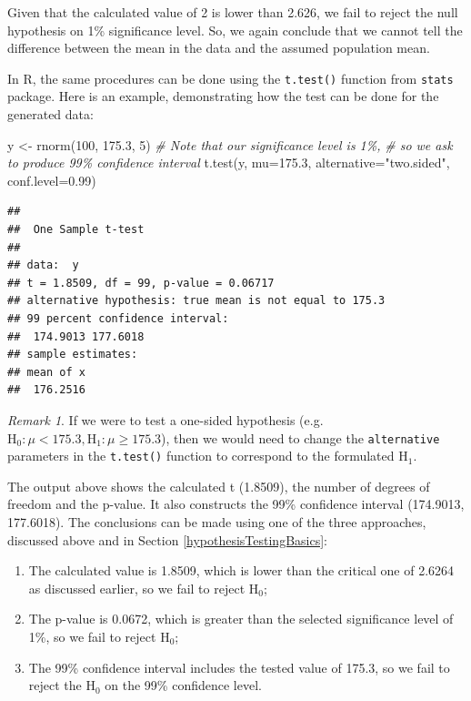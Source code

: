 \documentclass[
]{book}
\newenvironment{Shaded}{\begin{snugshade}}{\end{snugshade}}
\newcommand{\AttributeTok}[1]{\textcolor[rgb]{0.77,0.63,0.00}{#1}}
\newcommand{\CommentTok}[1]{\textcolor[rgb]{0.56,0.35,0.01}{\textit{#1}}}
\newcommand{\DecValTok}[1]{\textcolor[rgb]{0.00,0.00,0.81}{#1}}
\newcommand{\FloatTok}[1]{\textcolor[rgb]{0.00,0.00,0.81}{#1}}
\newcommand{\FunctionTok}[1]{\textcolor[rgb]{0.00,0.00,0.00}{#1}}
\newcommand{\NormalTok}[1]{#1}
\newcommand{\OtherTok}[1]{\textcolor[rgb]{0.56,0.35,0.01}{#1}}
\newcommand{\StringTok}[1]{\textcolor[rgb]{0.31,0.60,0.02}{#1}}
\providecommand{\tightlist}{%
  \setlength{\itemsep}{0pt}\setlength{\parskip}{0pt}}
\theoremstyle{definition}
\theoremstyle{definition}
\theoremstyle{definition}
\theoremstyle{definition}
\theoremstyle{remark}
\newtheorem*{remark}{Remark}
\begin{document}
Given that the calculated value of 2 is lower than 2.626, we fail to reject the null hypothesis on 1\% significance level. So, we again conclude that we cannot tell the difference between the mean in the data and the assumed population mean.

In R, the same procedures can be done using the \texttt{t.test()} function from \texttt{stats} package. Here is an example, demonstrating how the test can be done for the generated data:

\begin{Shaded}
\begin{Highlighting}[]
\NormalTok{y }\OtherTok{\textless{}{-}} \FunctionTok{rnorm}\NormalTok{(}\DecValTok{100}\NormalTok{, }\FloatTok{175.3}\NormalTok{, }\DecValTok{5}\NormalTok{)}
\CommentTok{\# Note that our significance level is 1\%,}
\CommentTok{\# so we ask to produce 99\% confidence interval}
\FunctionTok{t.test}\NormalTok{(y, }\AttributeTok{mu=}\FloatTok{175.3}\NormalTok{, }\AttributeTok{alternative=}\StringTok{"two.sided"}\NormalTok{, }\AttributeTok{conf.level=}\FloatTok{0.99}\NormalTok{)}
\end{Highlighting}
\end{Shaded}

\begin{verbatim}
## 
##  One Sample t-test
## 
## data:  y
## t = 1.8509, df = 99, p-value = 0.06717
## alternative hypothesis: true mean is not equal to 175.3
## 99 percent confidence interval:
##  174.9013 177.6018
## sample estimates:
## mean of x 
##  176.2516
\end{verbatim}

\begin{remark}
If we were to test a one-sided hypothesis (e.g.~\(\mathrm{H}_0: \mu < 175.3, \mathrm{H}_1: \mu \geq 175.3\)), then we would need to change the \texttt{alternative} parameters in the \texttt{t.test()} function to correspond to the formulated H\(_1\).
\end{remark}

The output above shows the calculated t (1.8509), the number of degrees of freedom and the p-value. It also constructs the 99\% confidence interval (174.9013, 177.6018). The conclusions can be made using one of the three approaches, discussed above and in Section \ref{hypothesisTestingBasics}:

\begin{enumerate}
\def\labelenumi{\arabic{enumi}.}
\tightlist
\item
  The calculated value is 1.8509, which is lower than the critical one of 2.6264 as discussed earlier, so we fail to reject H\(_0\);
\item
  The p-value is 0.0672, which is greater than the selected significance level of 1\%, so we fail to reject H\(_0\);
\item
  The 99\% confidence interval includes the tested value of 175.3, so we fail to reject the H\(_0\) on the 99\% confidence level.
\end{enumerate}
\end{document}
